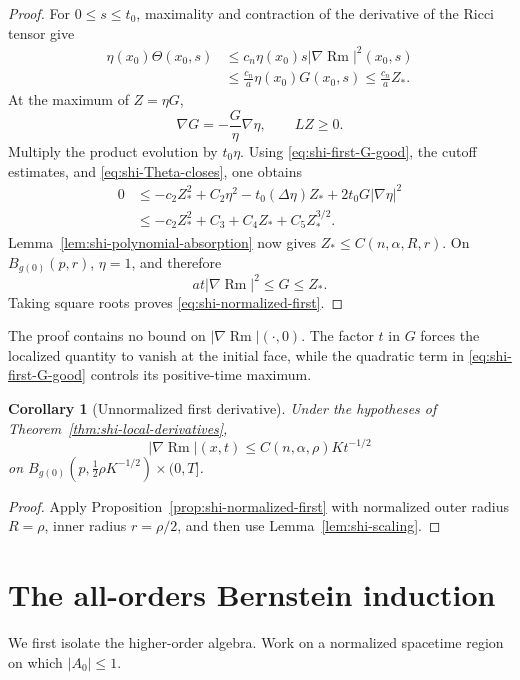 \documentclass[10pt]{coll-l}
\newtheorem{corollary}[theorem]{Corollary}
\theoremstyle{definition}
\theoremstyle{remark}
\numberwithin{section}{chapter}
\numberwithin{equation}{chapter}
\newcommand{\Rm}{\operatorname{Rm}}
\begin{document}
\begin{proof}
For $0\leq s\leq t_0$, maximality and contraction of the derivative of the
Ricci tensor give
\begin{align}
 \eta(x_0)\Theta(x_0,s)
   &\leq c_n\eta(x_0)s|\nabla\Rm|^2(x_0,s)\\
   &\leq \frac{c_n}{a}\eta(x_0)G(x_0,s)
    \leq \frac{c_n}{a}Z_*.                               \label{eq:shi-Theta-closes}
\end{align}
At the maximum of $Z=\eta G$,
\[
             \nabla G=-\frac G\eta\nabla\eta,
             \qquad LZ\geq0.
\]
Multiply the product evolution by $t_0\eta$.  Using
\eqref{eq:shi-first-G-good}, the cutoff estimates, and
\eqref{eq:shi-Theta-closes}, one obtains
\begin{align}
 0
 &\leq-c_2Z_*^2+C_2\eta^2
       -t_0(\Delta\eta)Z_*+2t_0G|\nabla\eta|^2\\
 &\leq-c_2Z_*^2+C_3+C_4Z_*+C_5Z_*^{3/2}.                 \label{eq:shi-first-polynomial}
\end{align}
Lemma~\ref{lem:shi-polynomial-absorption} now gives
$Z_*\leq C(n,\alpha,R,r)$.  On $B_{g(0)}(p,r)$, $\eta=1$, and therefore
\[
             at|\nabla\Rm|^2\leq G\leq Z_*.
\]
Taking square roots proves \eqref{eq:shi-normalized-first}.
\end{proof}

The proof contains no bound on $|\nabla\Rm|(\cdot,0)$.  The factor $t$ in
$G$ forces the localized quantity to vanish at the initial face, while the
quadratic term in \eqref{eq:shi-first-G-good} controls its positive-time
maximum.

\begin{corollary}[Unnormalized first derivative]
\label{cor:shi-local-first}
Under the hypotheses of Theorem~\ref{thm:shi-local-derivatives},
\[
       |\nabla\Rm|(x,t)
          \leq C(n,\alpha,\rho)Kt^{-1/2}
\]
on $B_{g(0)}(p,\frac12\rho K^{-1/2})\times(0,T]$.
\end{corollary}

\begin{proof}
Apply Proposition~\ref{prop:shi-normalized-first} with normalized outer
radius $R=\rho$, inner radius $r=\rho/2$, and then use
Lemma~\ref{lem:shi-scaling}.
\end{proof}

\section{The all-orders Bernstein induction}
\label{sec:shi-higher}

We first isolate the higher-order algebra.  Work on a normalized spacetime
region on which $|A_0|\leq1$.
\end{document}
